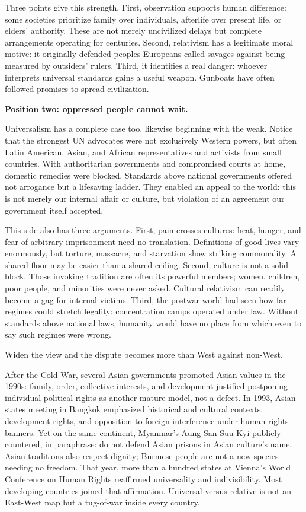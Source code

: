 Three points give this strength. First, observation supports human difference: some societies prioritize family over individuals, afterlife over present life, or elders' authority. These are not merely uncivilized delays but complete arrangements operating for centuries. Second, relativism has a legitimate moral motive: it originally defended peoples Europeans called savages against being measured by outsiders' rulers. Third, it identifies a real danger: whoever interprets universal standards gains a useful weapon. Gunboats have often followed promises to spread civilization.

\textbf{Position two: oppressed people cannot wait.}

Universalism has a complete case too, likewise beginning with the weak. Notice that the strongest UN advocates were not exclusively Western powers, but often Latin American, Asian, and African representatives and activists from small countries. With authoritarian governments and compromised courts at home, domestic remedies were blocked. Standards above national governments offered not arrogance but a lifesaving ladder. They enabled an appeal to the world: this is not merely our internal affair or culture, but violation of an agreement our government itself accepted.

This side also has three arguments. First, pain crosses cultures: heat, hunger, and fear of arbitrary imprisonment need no translation. Definitions of good lives vary enormously, but torture, massacre, and starvation show striking commonality. A shared floor may be easier than a shared ceiling. Second, culture is not a solid block. Those invoking tradition are often its powerful members; women, children, poor people, and minorities were never asked. Cultural relativism can readily become a gag for internal victims. Third, the postwar world had seen how far regimes could stretch legality: concentration camps operated under law. Without standards above national laws, humanity would have no place from which even to say such regimes were wrong.

Widen the view and the dispute becomes more than West against non-West.

After the Cold War, several Asian governments promoted Asian values in the 1990s: family, order, collective interests, and development justified postponing individual political rights as another mature model, not a defect. In 1993, Asian states meeting in Bangkok emphasized historical and cultural contexts, development rights, and opposition to foreign interference under human-rights banners. Yet on the same continent, Myanmar's Aung San Suu Kyi publicly countered, in paraphrase: do not defend Asian prisons in Asian culture's name. Asian traditions also respect dignity; Burmese people are not a new species needing no freedom. That year, more than a hundred states at Vienna's World Conference on Human Rights reaffirmed universality and indivisibility. Most developing countries joined that affirmation. Universal versus relative is not an East-West map but a tug-of-war inside every country.

